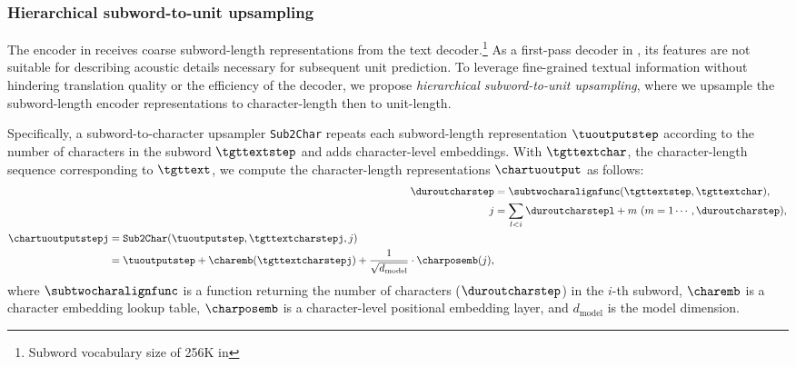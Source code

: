 \subsubsection{Hierarchical subword-to-unit upsampling}\label{sec:offline:unity2:hie_up}
The \tu encoder in \unitytwo receives coarse subword-length representations from the \xt text decoder.\footnote{Subword vocabulary size of 256K in \mfourt}
As a first-pass decoder in \unitytwo, its features are not suitable for describing acoustic details necessary for subsequent unit prediction.
To leverage fine-grained textual information without hindering translation quality or the efficiency of the \xt decoder, 
we propose \textit{hierarchical subword-to-unit upsampling}, where we upsample the subword-length \tu encoder representations to character-length then to unit-length.

Specifically, a subword-to-character upsampler \texttt{Sub2Char} repeats each subword-length representation $\tuoutputstep$ according to the number of characters in the subword $\tgttextstep$ and adds character-level embeddings.
With $\tgttextchar$, the character-length sequence corresponding to $\tgttext$, 
we compute the character-length representations $\chartuoutput$ as follows:
\begin{align}\label{eq:char_align}
\duroutcharstep & = \subtwocharalignfunc(\tgttextstep, \tgttextchar), \\
j & = \sum_{l<i} \duroutcharstepl + m \ (m = 1 \cdots, \duroutcharstep), \\
\begin{split}
\chartuoutputstepj & = \texttt{Sub2Char}(\tuoutputstep, \tgttextcharstepj, j) \\
& = \tuoutputstep + \charemb(\tgttextcharstepj) + \frac{1}{\sqrt{d_{\text{model}}}} \cdot \charposemb(j),
\end{split}
\end{align}
where $\subtwocharalignfunc$ is a function returning the number of characters ($\duroutcharstep$) in the $i$-th subword,
$\charemb$ is a character embedding lookup table, 
$\charposemb$ is a character-level positional embedding layer,
and $d_{\text{model}}$ is the model dimension.

